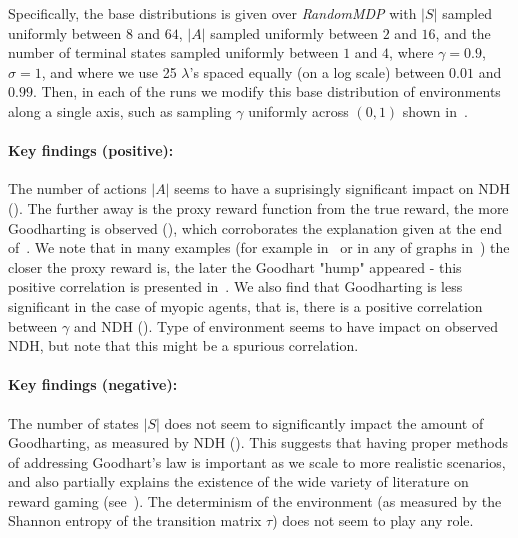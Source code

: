 Specifically, the base distributions is given over \emph{RandomMDP} with $|S|$ sampled uniformly between $8$ and $64$, $|A|$ sampled uniformly between $2$ and $16$, and the number of terminal states sampled uniformly between $1$ and $4$, where $\gamma = 0.9$, $\sigma = 1$, and where we use 25 $\lambda$'s spaced equally (on a log scale) between $0.01$ and $0.99$. Then, in each of the runs we modify this base distribution of environments along a single axis, such as sampling $\gamma$ uniformly across $(0, 1)$ shown in~.

\paragraph{Key findings (positive):} The number of actions $|A|$ seems to have a suprisingly significant impact on NDH (). The further away is the proxy reward function from the true reward, the more Goodharting is observed (), which corroborates the explanation given at the end of~. We note that in many examples (for example in~ or in any of graphs in~) the closer the proxy reward is, the later the Goodhart "hump" appeared - this positive correlation is presented in~. We also find that Goodharting is less significant in the case of myopic agents, that is, there is a positive correlation between $\gamma$ and NDH (). Type of environment seems to have impact on observed NDH, but note that this might be a spurious correlation.

\paragraph{Key findings (negative):} The number of states $|S|$ does not seem to significantly impact the amount of Goodharting, as measured by NDH (). This suggests that having proper methods of addressing Goodhart's law is important as we scale to more realistic scenarios, and also partially explains the existence of the wide variety of literature on reward gaming (see~). The determinism of the environment (as measured by the Shannon entropy of the transition matrix $\tau$) does not seem to play any role.

